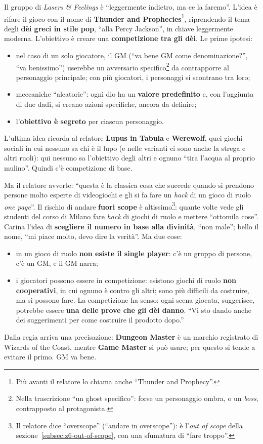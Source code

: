 Il gruppo di \emph{Lasers \& Feelings} è ``leggermente indietro, ma ce la
faremo''. L'idea è rifare il gioco con il nome di \textbf{Thunder and
Prophecies}\footnote{Più avanti il relatore lo chiama anche ``Thunder and
Prophecy''.}, riprendendo il tema degli \textbf{dèi greci in stile pop}, ``alla
Percy Jackson'', in chiave leggermente moderna. L'obiettivo è creare una
\textbf{competizione tra gli dèi}. Le prime ipotesi:
\begin{itemize}
  \item nel caso di un solo giocatore, il GM (``va bene GM come denominazione?'',
        ``va benissimo'') userebbe un avversario specifico\footnote{Nella
        trascrizione ``un ghost specifico'': forse un personaggio ombra, o un
        \emph{boss}, contrapposto al protagonista.} da contrapporre al
        personaggio principale; con più giocatori, i personaggi si scontrano
        tra loro;
  \item meccaniche ``aleatorie'': ogni dio ha un \textbf{valore predefinito} e,
        con l'aggiunta di due dadi, si creano azioni specifiche, ancora da
        definire;
  \item l'\textbf{obiettivo è segreto} per ciascun personaggio.
\end{itemize}
L'ultima idea ricorda al relatore \textbf{Lupus in Tabula} e \textbf{Werewolf},
quei giochi sociali in cui nessuno sa chi è il lupo (e nelle varianti ci sono
anche la strega e altri ruoli): qui nessuno sa l'obiettivo degli altri e ognuno
``tira l'acqua al proprio mulino''. Quindi c'è competizione di base.

Ma il relatore avverte: ``questa è la classica cosa che succede quando si prendono
persone molto esperte di videogiochi e gli si fa fare un \emph{hack} di un gioco
di ruolo \emph{one page}''. Il rischio di andare \textbf{fuori scope} è
altissimo\footnote{Il relatore dice ``overscope'' (``andare in overscope''): è
l'\emph{out of scope} della sezione~\ref{subsec:z6-out-of-scope}, con una
sfumatura di ``fare troppo''.}: quante volte vede gli studenti del corso di Milano
fare \emph{hack} di giochi di ruolo e mettere ``ottomila cose''. Carina l'idea di
\textbf{scegliere il numero in base alla divinità}, ``non male''; bello il nome,
``mi piace molto, devo dire la verità''. Ma due cose:
\begin{itemize}
  \item in un gioco di ruolo \textbf{non esiste il single player}: c'è un gruppo
        di persone, c'è un GM, e il GM narra;
  \item i giocatori possono essere in competizione: esistono giochi di ruolo
        \textbf{non cooperativi}, in cui ognuno è contro gli altri; sono più
        difficili da costruire, ma si possono fare. La competizione ha senso: ogni
        scena giocata, suggerisce, potrebbe essere \textbf{una delle prove che gli
        dèi danno}. ``Vi sto dando anche dei suggerimenti per come costruire il
        prodotto dopo.''
\end{itemize}
Dalla regia arriva una precisazione: \textbf{Dungeon Master} è un marchio
registrato di Wizards of the Coast, mentre \textbf{Game Master} si può usare; per
questo si tende a evitare il primo. GM va bene.


